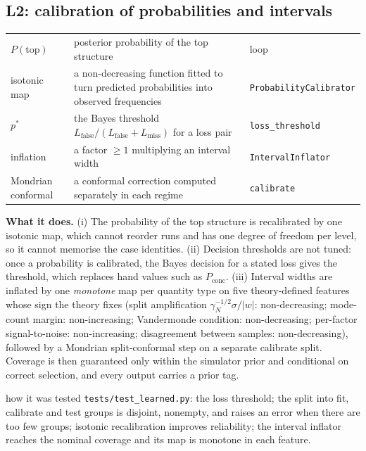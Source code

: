 \subsection{L2: calibration of probabilities and intervals}\label{sec:calib}
\begin{symbols}
\begin{tabular}{@{}L{2.6cm}L{6.0cm}L{4.3cm}@{}}
$P(\text{top})$ & posterior probability of the top structure & loop\\
isotonic map & a non-decreasing function fitted to turn predicted probabilities into observed frequencies & \texttt{ProbabilityCalibrator}\\
$p^*$ & the Bayes threshold $L_{\mathrm{false}}/(L_{\mathrm{false}}+L_{\mathrm{miss}})$ for a loss pair & \texttt{loss\_threshold}\\
inflation & a factor $\ge1$ multiplying an interval width & \texttt{IntervalInflator}\\
Mondrian conformal & a conformal correction computed separately in each regime & \texttt{calibrate}\\
\end{tabular}
\end{symbols}
\textbf{What it does.} (i) The probability of the top structure is recalibrated by one isotonic map, which cannot reorder runs and has one degree of freedom per level, so it cannot memorise the case identities. (ii) Decision thresholds are not tuned: once a probability is calibrated, the Bayes decision for a stated loss gives the threshold, which replaces hand values such as $P_{\mathrm{conc}}$. (iii) Interval widths are inflated by one \emph{monotone} map per quantity type on five theory-defined features whose sign the theory fixes (split amplification $\gamma_N^{-1/2}\sigma/|w|$: non-decreasing; mode-count margin: non-increasing; Vandermonde condition: non-decreasing; per-factor signal-to-noise: non-increasing; disagreement between samples: non-decreasing), followed by a Mondrian split-conformal step on a separate calibrate split. Coverage is then guaranteed only within the simulator prior and conditional on correct selection, and every output carries a prior tag.

\begin{explained}{how it was tested}
\texttt{tests/test\_learned.py}: the loss threshold; the split into fit, calibrate and test groups is disjoint, nonempty, and raises an error when there are too few groups; isotonic recalibration improves reliability; the interval inflator reaches the nominal coverage and its map is monotone in each feature.
\end{explained}

